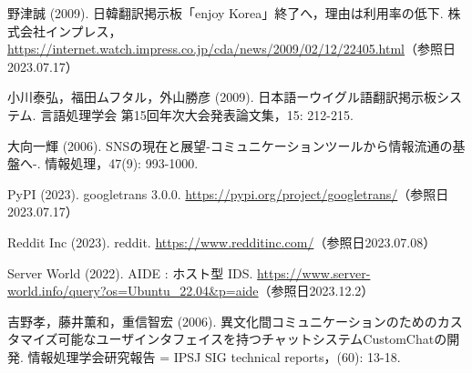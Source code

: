 \documentclass[b5paper,12pt,dvipdfmx]{jsreport}
\begin{document}
\begin{thebibliography}{99}
野津誠 (2009). 日韓翻訳掲示板「enjoy Korea」終了へ，理由は利用率の低下. 株式会社インプレス，\url{https://internet.watch.impress.co.jp/cda/news/2009/02/12/22405.html}（参照日2023.07.17）

小川泰弘，福田ムフタル，外山勝彦 (2009). 日本語ーウイグル語翻訳掲示板システム. 言語処理学会 第15回年次大会発表論文集，15: 212-215.

大向一輝 (2006). SNSの現在と展望-コミュニケーションツールから情報流通の基盤へ-. 情報処理，47(9): 993-1000.

PyPI (2023). googletrans 3.0.0. \url{https://pypi.org/project/googletrans/}（参照日2023.07.17）

Reddit Inc (2023). reddit. \url{https://www.redditinc.com/}（参照日2023.07.08）

Server World (2022). AIDE : ホスト型 IDS. \url{https://www.server-world.info/query?os=Ubuntu_22.04&p=aide}（参照日2023.12.2）

吉野孝，藤井薫和，重信智宏 (2006). 異文化間コミュニケーションのためのカスタマイズ可能なユーザインタフェイスを持つチャットシステムCustomChatの開発. 情報処理学会研究報告 = IPSJ SIG technical reports，(60): 13-18.

\end{thebibliography}
\end{document}
